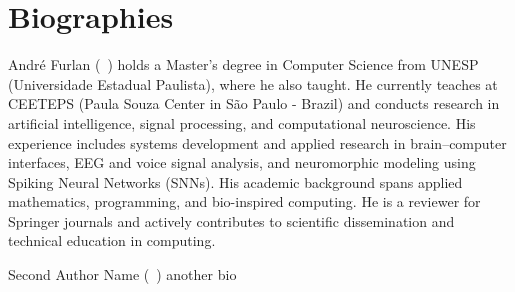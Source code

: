 \section*{Biographies}
\label{sec:bio}

\begin{IEEEbiographynophoto}{André Furlan}
	(~) holds a Master’s degree in Computer Science from UNESP (Universidade Estadual Paulista), where he also taught. He currently teaches at CEETEPS (Paula Souza Center in São Paulo - Brazil) and conducts research in artificial intelligence, signal processing, and computational neuroscience. His experience includes systems development and applied research in brain–computer interfaces, EEG and voice signal analysis, and neuromorphic modeling using Spiking Neural Networks (SNNs). His academic background spans applied mathematics, programming, and bio-inspired computing. He is a reviewer for Springer journals and actively contributes to scientific dissemination and technical education in computing.
\end{IEEEbiographynophoto}
%
\vspace{11pt}

\begin{IEEEbiographynophoto}{Second Author Name}
	(~) another bio
\end{IEEEbiographynophoto}

\vfill